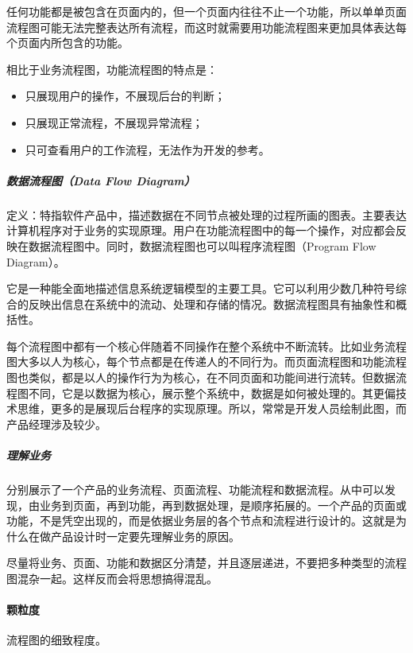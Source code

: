 \documentclass[letterpaper,11pt,english]{sphinxmanual}
\begin{document}
任何功能都是被包含在页面内的，但一个页面内往往不止一个功能，所以单单页面流程图可能无法完整表达所有流程，而这时就需要用功能流程图来更加具体表达每个页面内所包含的功能。

相比于业务流程图，功能流程图的特点是：
\begin{itemize}
\item {} 
只展现用户的操作，不展现后台的判断；

\item {} 
只展现正常流程，不展现异常流程；

\item {} 
只可查看用户的工作流程，无法作为开发的参考。

\end{itemize}


\subparagraph{数据流程图（Data Flow Diagram）}
\label{\detokenize{chapter_knowledge/flow_chart:data-flow-diagram}}
定义：特指软件产品中，描述数据在不同节点被处理的过程所画的图表。主要表达计算机程序对于业务的实现原理。用户在功能流程图中的每一个操作，对应都会反映在数据流程图中。同时，数据流程图也可以叫程序流程图（Program
Flow Diagram）。

它是一种能全面地描述信息系统逻辑模型的主要工具。它可以利用少数几种符号综合的反映出信息在系统中的流动、处理和存储的情况。数据流程图具有抽象性和概括性。

每个流程图中都有一个核心伴随着不同操作在整个系统中不断流转。比如业务流程图大多以人为核心，每个节点都是在传递人的不同行为。而页面流程图和功能流程图也类似，都是以人的操作行为为核心，在不同页面和功能间进行流转。但数据流程图不同，它是以数据为核心，展示整个系统中，数据是如何被处理的。其更偏技术思维，更多的是展现后台程序的实现原理。所以，常常是开发人员绘制此图，而产品经理涉及较少。


\subparagraph{理解业务}
\label{\detokenize{chapter_knowledge/flow_chart:id13}}
分别展示了一个产品的业务流程、页面流程、功能流程和数据流程。从中可以发现，由业务到页面，再到功能，再到数据处理，是顺序拓展的。一个产品的页面或功能，不是凭空出现的，而是依据业务层的各个节点和流程进行设计的。这就是为什么在做产品设计时一定要先理解业务的原因。

尽量将业务、页面、功能和数据区分清楚，并且逐层递进，不要把多种类型的流程图混杂一起。这样反而会将思想搞得混乱。


\paragraph{颗粒度}
\label{\detokenize{chapter_knowledge/flow_chart:id14}}
流程图的细致程度。
\end{document}
